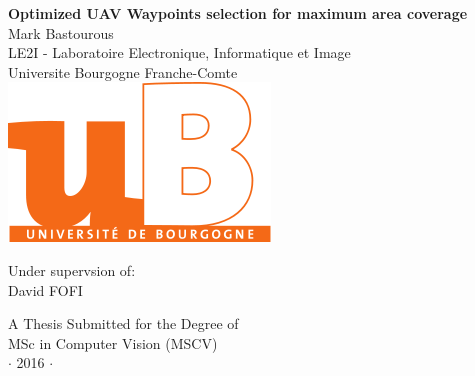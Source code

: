 
\newpage
\thispagestyle{empty}


\vspace*{2cm}
\begin{center}
{\Large\bf Optimized UAV Waypoints selection for maximum area coverage\\} \vspace{2cm} {\large
Mark Bastourous\\
\vspace{1.5cm}
LE2I - Laboratoire Electronique, Informatique et Image \\
Universite Bourgogne Franche-Comte}\\

\vspace{2 cm}
\includegraphics[height=0.1\textheight]{figures/ublogo.png}


\vspace{1.5cm}
{\large Under supervsion of: \\
David FOFI}
\end{center}

\vspace{2cm}
\begin{center}
{\large A Thesis Submitted for the Degree of \\MSc in Computer Vision 
(MSCV) \\\vspace{0.3cm} $\cdot$ 2016
$\cdot$}

\end{center}
\singlespacing


